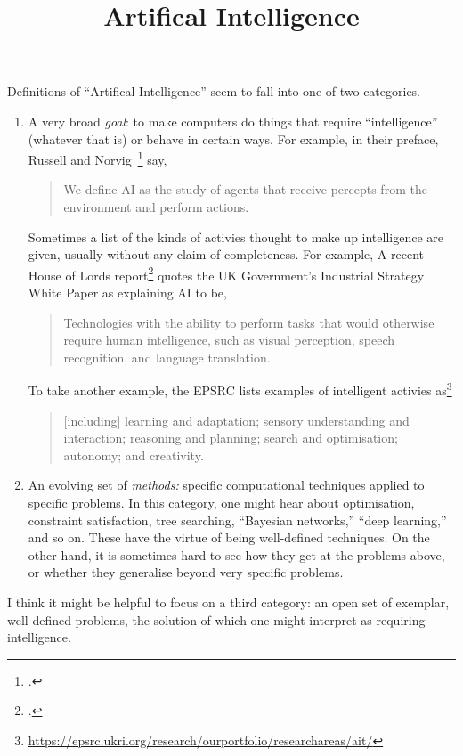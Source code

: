 \documentclass[10pt, a4paper, twocolumn]{article}
\title{Artifical Intelligence}
\begin{document}
\maketitle

Definitions of ``Artifical Intelligence'' seem to fall into one of two
categories.
\begin{enumerate}
\item\label{item:ai-goals} A very broad \emph{goal}: to make computers do things
  that require ``intelligence'' (whatever that is) or behave in certain
  ways. For example, in their preface, Russell and Norvig~\footcite{ai:rn} say,
  \begin{quote}
    We define AI as the study of agents that receive percepts from the
    environment and perform actions. 
  \end{quote}
  Sometimes a list of the kinds of activies thought to make up intelligence are
  given, usually without any claim of completeness. For example, A recent House
  of Lords report\footcite{ai:lords} quotes the UK Government's Industrial
  Strategy White Paper as explaining AI to be,
  \begin{quote}
    Technologies with the ability to perform tasks that would otherwise require
    human intelligence, such as visual perception, speech recognition, and
    language translation.
  \end{quote}
  To take another example, the EPSRC lists examples of intelligent activies
  as\footnote{\url{https://epsrc.ukri.org/research/ourportfolio/researchareas/ait/}}
  \begin{quote}
  [including] learning and adaptation; sensory understanding and interaction;
  reasoning and planning; search and optimisation; autonomy; and creativity.
  \end{quote}
\item\label{item:ai-methods} An evolving set of \emph{methods:} specific
  computational techniques applied to specific problems. In this category, one
  might hear about optimisation, constraint satisfaction, tree searching,
  ``Bayesian networks,'' ``deep learning,'' and so on. These have the virtue of
  being well-defined techniques. On the other hand, it is sometimes hard to see
  how they get at the problems above, or whether they generalise beyond very
  specific problems.
\end{enumerate}

I think it might be helpful to focus on a third category: an open set of
exemplar, well-defined problems, the solution of which one might interpret as
requiring intelligence.
\end{document}
